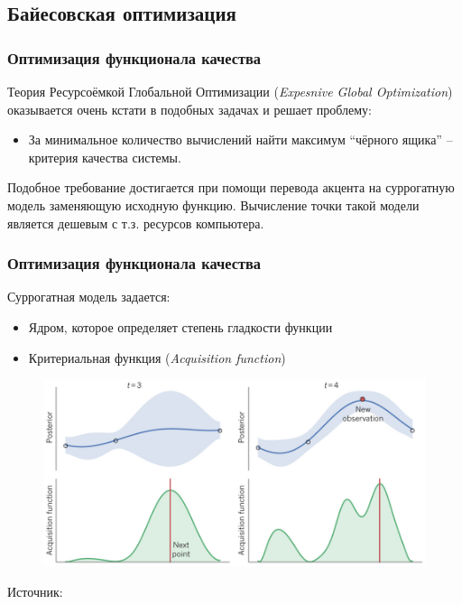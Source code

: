 \documentclass{beamer}
\begin{document}
\subsection{Байесовская оптимизация} 
\begin{frame}
\frametitle{Оптимизация функционала качества}
Теория Ресурсоёмкой Глобальной Оптимизации (\textit{Expesnive Global Optimization}\cite{ego-jones}) оказывается очень кстати в подобных задачах и решает проблему: \\
\begin{itemize}
\item За минимальное количество вычислений найти максимум ``чёрного ящика'' -- критерия качества системы.
\end{itemize}
Подобное требование достигается при помощи перевода акцента на суррогатную модель заменяющую исходную функцию. Вычисление точки такой модели является дешевым с т.з. ресурсов компьютера.
\end{frame}

\begin{frame}
\frametitle{Оптимизация функционала качества}
Суррогатная модель задается:
\begin{itemize}
\item Ядром, которое определяет степень гладкости функции
\item Критериальная функция (\textit{Acquisition function})
\end{itemize}
\begin{figure}
   \includegraphics[scale=0.25]{bo.jpg}
\end{figure}
\hspace*{5pt}\hbox{\scriptsize Источник:}\\
\end{frame}
\end{document}
